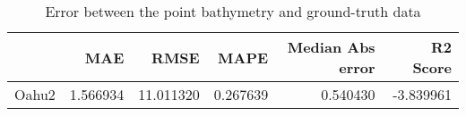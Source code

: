 \begin{table}[h!]
\caption{Error between the point bathymetry and ground-truth data}
\label{tab:Oahu2_lidar_error}
\begin{tabular}{lrrrrr}
\toprule
 & MAE & RMSE & MAPE & Median Abs error & R2 Score \\
\midrule
Oahu2 & 1.566934 & 11.011320 & 0.267639 & 0.540430 & -3.839961 \\
\bottomrule
\end{tabular}
\end{table}
